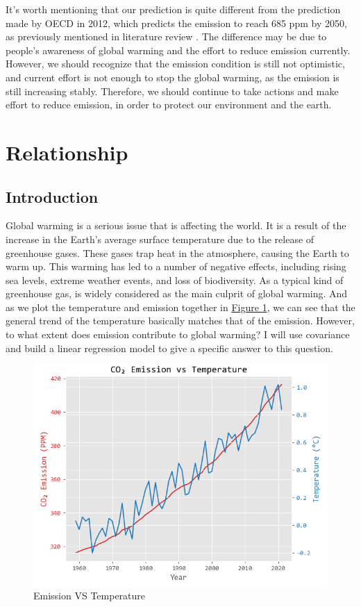 \documentclass[12pt,a4paper]{article}
\begin{document}
    It's worth mentioning that our prediction is quite different from the prediction made by OECD in 2012, which predicts the  emission to reach 685 ppm by 2050, as previously mentioned in literature review \autocite{organisation_for_economic_co-operations_and_development_oecd_2012}. The difference may be due to people's awareness of global warming and the effort to reduce  emission currently. However, we should recognize that the emission condition is still not optimistic, and current effort is not enough to stop the global warming, as the  emission is still increasing stably. Therefore, we should continue to take actions and make effort to reduce  emission, in order to protect our environment and the earth.

    \section{Relationship}
    \subsection{Introduction}
    
    Global warming is a serious issue that is affecting the world. It is a result of the increase in the Earth's average surface temperature due to the release of greenhouse gases. These gases trap heat in the atmosphere, causing the Earth to warm up. This warming has led to a number of negative effects, including rising sea levels, extreme weather events, and loss of biodiversity. As a typical kind of greenhouse gas,  is widely considered as the main culprit of global warming. And as we plot the temperature and  emission together in \hyperref[co2_temp]{Figure \ref*{co2_temp}}, we can see that the general trend of the temperature basically matches that of the  emission. However, to what extent does  emission contribute to global warming? I will use covariance and build a linear regression model to give a specific answer to this question.
    
    \begin{figure}[htbp]
        \centering
        \includegraphics[width=0.5\linewidth]{img/co2_temp.png}
        \caption{ Emission VS Temperature}
        \label{co2_temp}
    \end{figure}
    
\end{document}
